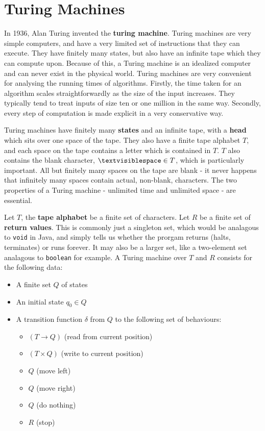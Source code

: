 \documentclass[11pt]{article}
\begin{document}
	\section{Turing Machines}
	In 1936, Alan Turing invented the \textbf{turing machine}. Turing machines are very simple computers, and have a very limited set of instructions that they can execute. They have finitely many states, but also have an infinite tape which they can compute upon. Because of this, a Turing machine is an idealized computer and can never exist in the physical world. Turing machines are very convenient for analysing the running times of algorithms. Firstly, the time taken for an algorithm scales straightforwardly as the size of the input increases. They typically tend to treat inputs of size ten or one million in the same way. Secondly, every step of computation is made explicit in a very conservative way.
	
	\par 
	Turing machines have finitely many \textbf{states} and an infinite tape, with a \textbf{head} which sits over one space of the tape. They also have a finite tape alphabet $T$, and each space on the tape contains a letter which is contained in $T$. $T$ also contains the blank character, $\textvisiblespace \in T$, which is particularly important. All but finitely many spaces on the tape are blank - it never happens that infinitely many spaces contain actual, non-blank, characters. The two properties of a Turing machine - unlimited time and unlimited space - are essential.
	
	\par 
	Let $T$, the \textbf{tape alphabet} be a finite set of characters. Let $R$ be a finite set of \textbf{return values}. This is commonly just a singleton set, which would be analagous to \texttt{void} in Java, and simply tells us whether the prorgam returns (halts, terminates) or runs forever. It may also be a larger set, like a two-element set analagous to \texttt{boolean} for example. A Turing machine over $T$ and $R$ consists for the following data:
	\begin{itemize}
		\item A finite set $Q$ of states
		\item An initial state $q_{0} \in Q$
		\item A transition function $\delta$ from $Q$ to the following set of behaviours:
			\begin{itemize}
				\item $(T \rightarrow Q)$ (read from current position)
				\item $(T \times Q)$ (write to current position)
				\item $Q$ (move left)
				\item $Q$ (move right)
				\item $Q$ (do nothing)
				\item $R$ (stop)
			\end{itemize}
	\end{itemize}
	
\end{document}
